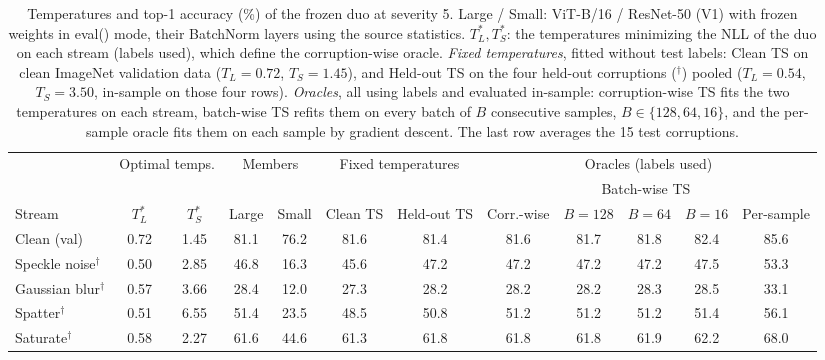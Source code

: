 \begin{table}[t]
    \centering
    \small
    \setlength{\tabcolsep}{4.5pt}
    \caption{Temperatures and top-1 accuracy (\%) of the frozen duo at severity 5. Large / Small: ViT-B/16 / ResNet-50 (V1) with frozen weights in eval() mode, their BatchNorm layers using the source statistics. $T_L^*, T_S^*$: the temperatures minimizing the NLL of the duo on each stream (labels used), which define the corruption-wise oracle. \emph{Fixed temperatures}, fitted without test labels: Clean TS on clean ImageNet validation data ($T_L = 0.72$, $T_S = 1.45$), and Held-out TS on the four held-out corruptions ($^\dagger$) pooled ($T_L = 0.54$, $T_S = 3.50$, in-sample on those four rows). \emph{Oracles}, all using labels and evaluated in-sample: corruption-wise TS fits the two temperatures on each stream, batch-wise TS refits them on every batch of $B$ consecutive samples, $B \in \{128, 64, 16\}$, and the per-sample oracle fits them on each sample by gradient descent. The last row averages the 15 test corruptions.}
    \label{tab:temperatures:frozen__vitb16_rn50v1}
    \label{tab:oracles:frozen__vitb16_rn50v1}
    \begin{tabular}{l|cc|cc|cc|ccccc}
        \toprule
        & \multicolumn{2}{c|}{Optimal temps.} & \multicolumn{2}{c|}{Members} & \multicolumn{2}{c|}{Fixed temperatures} & \multicolumn{5}{c}{Oracles (labels used)} \\
         &  &  &  &  &  &  &  & \multicolumn{3}{c}{Batch-wise TS} &  \\
        \cmidrule(lr){9-11}
        Stream & $T_L^*$ & $T_S^*$ & Large & Small & Clean TS & Held-out TS & Corr.-wise & $B{=}128$ & $B{=}64$ & $B{=}16$ & Per-sample \\
        \midrule
        Clean (val) & 0.72 & 1.45 & 81.1 & 76.2 & 81.6 & 81.4 & 81.6 & 81.7 & 81.8 & 82.4 & 85.6 \\
        \midrule
        Speckle noise$^\dagger$ & 0.50 & 2.85 & 46.8 & 16.3 & 45.6 & 47.2 & 47.2 & 47.2 & 47.2 & 47.5 & 53.3 \\
        Gaussian blur$^\dagger$ & 0.57 & 3.66 & 28.4 & 12.0 & 27.3 & 28.2 & 28.2 & 28.2 & 28.3 & 28.5 & 33.1 \\
        Spatter$^\dagger$ & 0.51 & 6.55 & 51.4 & 23.5 & 48.5 & 50.8 & 51.2 & 51.2 & 51.2 & 51.4 & 56.1 \\
        Saturate$^\dagger$ & 0.58 & 2.27 & 61.6 & 44.6 & 61.3 & 61.8 & 61.8 & 61.8 & 61.9 & 62.2 & 68.0 \\

\end{tabular}
\end{table}
